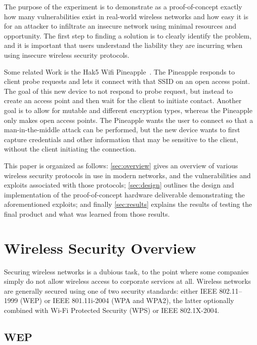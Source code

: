 \documentclass[journal, compsoc]{IEEEtran}
\begin{document}
The purpose of the experiment is to demonstrate as a proof-of-concept
exactly how many vulnerabilities exist in real-world wireless networks
and how easy it is for an attacker to infiltrate an insecure network
using minimal resources and opportunity. The first step to finding a
solution is to clearly identify the problem, and it is important that
users understand the liability they are incurring when using insecure
wireless security protocols.

Some related Work is the Hak5 Wifi Pineapple~\cite{hak5pineapple}. The
Pineapple responds to client probe requests and lets it connect with
that SSID on an open access point. The goal of this new device to not
respond to probe request, but instead to create an access point and
then wait for the client to initiate contact. Another goal is to allow for
mutable and different encryption types, whereas the Pineapple only
makes open access points. The Pineapple wants the user to connect so
that a man-in-the-middle attack can be performed, but the new device
wants to first capture credentials and other information that may be
sensitive to the client, without the client initiating the connection.

This paper is organized as follows: \autoref{sec:overview} gives an
overview of various wireless security protocols in use in modern
networks, and the vulnerabilities and exploits associated with those
protocols; \autoref{sec:design} outlines the design and implementation
of the proof-of-concept hardware deliverable demonstrating the
aforementioned exploits; and finally \autoref{sec:results} explains
the results of testing the final product and what was learned from
those results.

\section{Wireless Security Overview}
\label{sec:overview}

Securing wireless networks is a dubious task, to the point where some
companies simply do not allow wireless access to corporate services at
all. Wireless networks are generally secured using one of two security
standards: either IEEE 802.11--1999 (WEP) or IEEE 801.11i-2004 (WPA and
WPA2), the latter optionally combined with Wi-Fi Protected Security
(WPS) or IEEE 802.1X-2004.

\subsection{WEP}
\label{sec:overview-wep}
\end{document}
